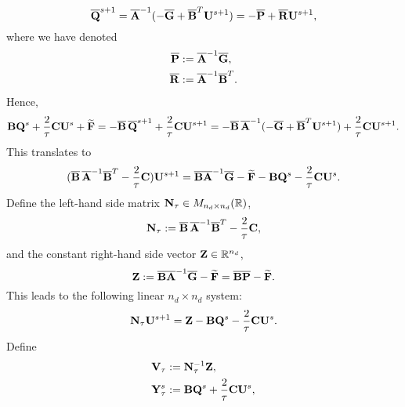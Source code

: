 \begin{discussion}
  \begin{equation}
    \overline{\bf Q}^{s + 1}
    = \overline{\bf A}^{-1}
      (- \overline{\bf G} + \overline{\bf B}^T {\bf U}^{s + 1})
    = - \overline{\bf P}
    + \overline{\bf R} {\bf U}^{s + 1},
  \end{equation}
  where we have denoted
  \begin{align}
    \overline{\bf P} & := \overline{\bf A}^{-1} \overline{\bf G}, \\
    \overline{\bf R} & := \overline{\bf A}^{-1} \overline{\bf B}^T.
  \end{align}
  Hence,
  \begin{equation}
    {\bf B} {\bf Q}^s + \frac{2}{\tau} {\bf C} {\bf U}^s + \widetilde{\bf F}
    = - \overline{\bf B}\, \overline{\bf Q}^{s + 1}
      + \frac{2}{\tau} {\bf C} {\bf U}^{s + 1}
    = - \overline{\bf B}\, \overline{\bf A}^{-1}
      (- \overline{\bf G} + \overline{\bf B}^T {\bf U}^{s + 1})
      + \frac{2}{\tau} {\bf C} {\bf U}^{s + 1}.
  \end{equation}
  This translates to
  \begin{equation}
    (\overline{\bf B}\, \overline{\bf A}^{-1} \overline{\bf B}^T
    - \frac{2}{\tau} {\bf C}) {\bf U}^{s + 1}
    = \overline{\bf B} \overline{\bf A}^{-1} \overline{\bf G}
    - \widetilde{\bf F} - {\bf B} {\bf Q}^s - \frac{2}{\tau} {\bf C} {\bf U}^s.
  \end{equation}
  Define the left-hand side matrix ${\bf N}_\tau \in M_{n_d \times n_d}(\mathbb{R})$,
  \begin{equation}
    {\bf N}_\tau
    := \overline{\bf B}\, \overline{\bf A}^{-1} \overline{\bf B}^T
      - \frac{2}{\tau} {\bf C},
  \end{equation}
  and the constant right-hand side vector ${\bf Z} \in \mathbb{R}^{n_d}$,
  \begin{equation}
    {\bf Z}
    := \overline{\bf B} \overline{\bf A}^{-1} \overline{\bf G}
      - \widetilde{\bf F}
    = \overline{\bf B} \overline{\bf P} - \widetilde{\bf F}.
  \end{equation}
  This leads to the following linear $n_d \times n_d$ system:
  \begin{equation}
    {\bf N}_\tau {\bf U}^{s + 1}
    = {\bf Z} - {\bf B} {\bf Q}^s - \frac{2}{\tau} {\bf C} {\bf U}^s.
  \end{equation}
  Define 
  \begin{align}
    {\bf V}_\tau   & := {\bf N}_\tau^{-1} {\bf Z}, \\
    {\bf Y}_\tau^s & := {\bf B} {\bf Q}^s + \frac{2}{\tau} {\bf C} {\bf U}^s, \\

\end{align}
\end{discussion}
